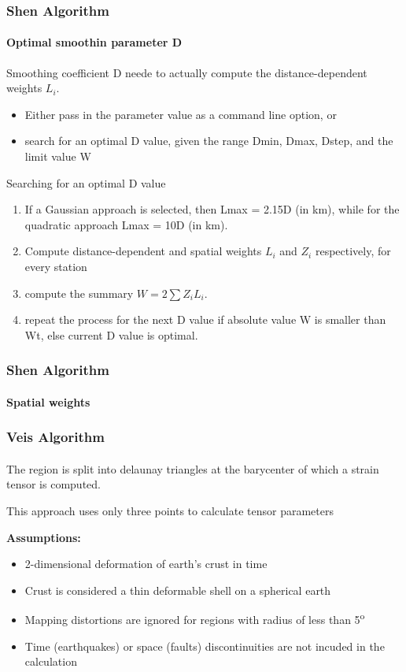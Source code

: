 \begin{frame}
  \frametitle{Shen Algorithm}
  \framesubtitle{Optimal smoothin parameter D}
  \label{ch2:}
 
  Smoothing coefficient D neede to actually compute the distance-dependent weights  $L_{i}$.
 
  \begin{itemize}
    \item Either pass in the parameter value as a command line option, or
    \item search for an optimal D value, given the range Dmin, Dmax, Dstep, and the limit value W
  \end{itemize}
  
  Searching for an optimal D value
  
  \begin{enumerate}
    \item If a Gaussian approach is selected, then Lmax = 2.15D (in km), while for the quadratic approach Lmax = 10D (in km).
    \item Compute distance-dependent and spatial weights $ L_{i} $ and $ Z_{i} $ respectively, for every station
    \item compute the summary $ W = 2\sum Z_{i} L_{i} $.
    \item repeat the process for the next D value if absolute value W is smaller than Wt, else current D value is optimal.
  \end{enumerate}
 
 

\end{frame}
\note{}

\begin{frame}
  \frametitle{Shen Algorithm}
  \framesubtitle{Spatial weights}
  \label{ch2:}
  
\end{frame}
\note{}

\begin{frame}
  \frametitle{Veis Algorithm}
  \framesubtitle{}
  \label{ch2:}
  
  The region is split into delaunay triangles at the barycenter of which a strain tensor is computed.
  
  This approach uses only three points to calculate tensor parameters
  
  \textbf{Assumptions:}
  \begin{itemize}
    \item 2-dimensional deformation of earth's crust in time
    \item Crust is considered a thin deformable shell on a spherical earth
    \item Mapping distortions are ignored for regions with radius of less than 5\textsuperscript{o}
    \item Time (earthquakes) or space (faults) discontinuities are not incuded in the calculation
  \end{itemize}
\end{frame}
\note{}

